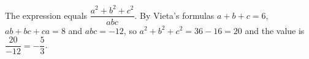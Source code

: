 The expression equals $\dfrac{a^2+b^2+c^2}{abc}$. By Vieta's formulas $a+b+c=6$, $ab+bc+ca=8$ and $abc=-12$, so $a^2+b^2+c^2=36-16=20$ and the value is $\dfrac{20}{-12}=\boxed{-\dfrac{5}{3}}$.
